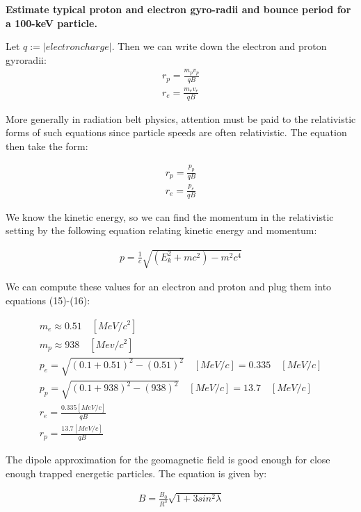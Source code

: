 \textbf{Estimate typical proton and electron gyro-radii and bounce
period for a 100-keV particle.}

Let $q := |electron charge|$. Then we can write down the electron and
proton gyroradii:
  \begin{align*}
    r_{p} = \frac{m_{p}v_{{p}}}{qB} \\
    r_{e} = \frac{m_{e}v_{{e}}}{qB}
  \end{align*}

More generally in radiation belt physics, attention must be paid to the
relativistic forms of such equations since particle speeds are often
relativistic. The equation then take the form:

\begin{align}
  r_{p} = \frac{p_{{p}}}{qB} \\
  r_{e} = \frac{p_{{e}}}{qB}
\end{align}

We know the kinetic energy, so we can find the momentum in the relativistic
setting by the following equation relating kinetic energy and momentum:

\begin{align}
  p =\frac{1}{c} \sqrt{(E_{k}^{2}+mc^{2}) - m^{2}c^{4}}
\end{align}


We can compute these values for an electron and proton and plug them
into equations (15)-(16):

\begin{gather*}
  m_{e} \approx 0.51 \quad[MeV/c^{2}] \\
  m_{p} \approx 938 \quad[Mev/c^{2}] \\
  p_{e} =\sqrt{ (0.1+0.51)^{2} - (0.51)^{2} } \quad[MeV/c] =
  0.335 \quad[MeV/c]  \\
  p_{p} =\sqrt{ (0.1+938)^{2} - (938)^{2} } \quad[MeV/c] = 13.7
  \quad[MeV/c] \\
  r_{e} = \frac{0.335 [MeV/c]}{qB} \\
  r_{p} = \frac{13.7 [MeV/c]}{qB}
\end{gather*}

The dipole approximation for the geomagnetic field is good enough for
close enough trapped energetic particles. The equation is given by:

\begin{align}
  B = \frac{B_{0}}{R^{3}}\sqrt{1+3sin^{2}\lambda}\\
\end{align}

